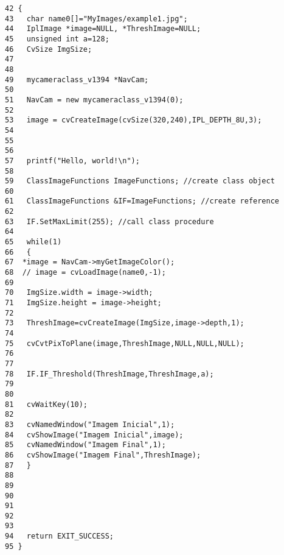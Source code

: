 \footnotesize\begin{verbatim}42 {
43   char name0[]="MyImages/example1.jpg";
44   IplImage *image=NULL, *ThreshImage=NULL;
45   unsigned int a=128;
46   CvSize ImgSize;
47   
48   
49   mycameraclass_v1394 *NavCam;
50   
51   NavCam = new mycameraclass_v1394(0);
52   
53   image = cvCreateImage(cvSize(320,240),IPL_DEPTH_8U,3);
54   
55   
56   
57   printf("Hello, world!\n");
58 
59   ClassImageFunctions ImageFunctions; //create class object
60   
61   ClassImageFunctions &IF=ImageFunctions; //create reference
62   
63   IF.SetMaxLimit(255); //call class procedure
64   
65   while(1)
66   {
67  *image = NavCam->myGetImageColor();
68  // image = cvLoadImage(name0,-1);
69   
70   ImgSize.width = image->width;
71   ImgSize.height = image->height;
72   
73   ThreshImage=cvCreateImage(ImgSize,image->depth,1);
74   
75   cvCvtPixToPlane(image,ThreshImage,NULL,NULL,NULL);
76   
77   
78   IF.IF_Threshold(ThreshImage,ThreshImage,a);
79   
80   
81   cvWaitKey(10);
82   
83   cvNamedWindow("Imagem Inicial",1);
84   cvShowImage("Imagem Inicial",image);
85   cvNamedWindow("Imagem Final",1);
86   cvShowImage("Imagem Final",ThreshImage);
87   }
88   
89 
90   
91   
92   
93   
94   return EXIT_SUCCESS;
95 }
\end{verbatim}\normalsize 


